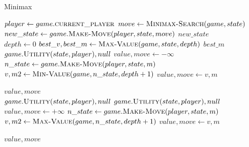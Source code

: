 \documentclass[journal]{IEEEtran}
\begin{document}
    \begin{algorithm}[H]
    \caption{Minimax}\label{alg:cap1}
    \begin{algorithmic}
    
        \State $player  \gets game.\Call{current\_player}{}$
      \State $ move  \gets \Call{Minimax-Search}{game, state}$
      \State $new\_state \gets game.\Call {Make-Move}{player, state, move}$
      \State \Return $new\_state$
    \EndFunction \\
    
        \State $depth  \gets 0$
        \State $best\_v, best\_m \gets \Call{Max-Value}{game,  state, depth}  $
        \State \Return $best\_m$
    \EndFunction\\
    
        \State \Return $ game.\Call{Utility}{state, player}, null$
        \EndIf
        \State $value, move \gets -\infty$
        \State $n\_state \gets game.\Call{Make-Move}{player, state, m}$
          \State $v, m2 \gets \Call{Min-Value}{game, n\_state, depth+1}$
            \State $value, move \gets v, m$
            
          \EndIf
        \EndFor
        \State \Return $value, move$
      \EndFunction\\
    
      \State  \Return $game.\Call{Utility}{state, player}, null$
      \EndIf
        \State \Return $ game.\Call{Utility}{state, player}, null$
        \EndIf
        \State $value, move \gets +\infty$
        \State $n\_state \gets game.\Call{Make-Move}{player, state, m}$
          \State $v, m2 \gets \Call{Max-Value}{game, n\_state, depth+1}$
            \State $value, move \gets v, m$
            
          \EndIf
        \EndFor
        \State \Return $value, move$
      \EndFunction
    
    
    \end{algorithmic}
    \end{algorithm}

\newpage
\end{document}
